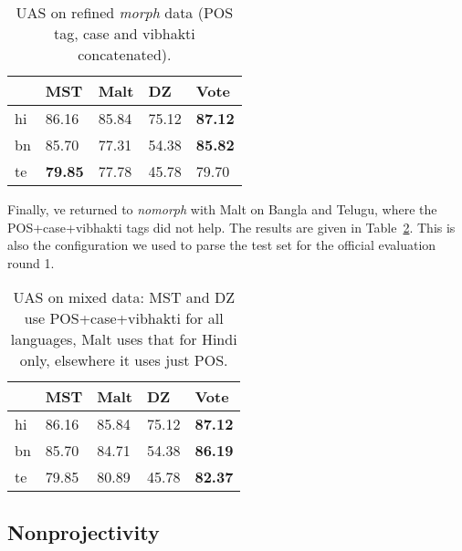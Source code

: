 \documentclass[11pt]{article}
\def\Tref#1{Table~\ref{#1}}
\begin{document}
\begin{table}[ht]
\begin{centering}
\begin{tabular}{l|l|l|l|l}
& \textbf{MST} & \textbf{Malt} & \textbf{DZ} & \textbf{Vote}\\
\hline
hi & 86.16 & 85.84 & 75.12 & \textbf{87.12}\\
bn & 85.70 & 77.31 & 54.38 & \textbf{85.82}\\
te & \textbf{79.85} & 77.78 & 45.78 & 79.70\\
\end{tabular}
\caption{UAS on refined \textit{morph} data (POS tag, case and vibhakti concatenated).}
\label{tab:poscasevib}
\end{centering}
\end{table}

Finally, ve returned to \textit{nomorph} with Malt on Bangla and Telugu, where the POS+case+vibhakti tags did not help. The results are given in \Tref{tab:posmix2}. This is also the configuration we used to parse the test set for the official evaluation round 1.

\begin{table}[ht]
\begin{centering}
\begin{tabular}{l|l|l|l|l}
& \textbf{MST} & \textbf{Malt} & \textbf{DZ} & \textbf{Vote}\\
\hline
hi & 86.16 & 85.84 & 75.12 & \textbf{87.12}\\
bn & 85.70 & 84.71 & 54.38 & \textbf{86.19}\\
te & 79.85 & 80.89 & 45.78 & \textbf{82.37}\\
\end{tabular}
\caption{UAS on mixed data: MST and DZ use POS+case+vibhakti for all languages, Malt uses that for Hindi only, elsewhere it uses just POS.}
\label{tab:posmix2}
\end{centering}
\end{table}

\subsection{Nonprojectivity}
\label{sec:nonprojectivity}
\end{document}
